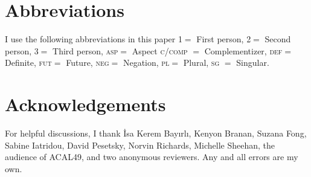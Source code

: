 \documentclass[output=paper,colorlinks,citecolor=brown]{langscibook}
\begin{document}
\section*{Abbreviations}
I use the following abbreviations in this paper
1$=$ First person, 
2$=$ Second  person, 
3$=$ Third  person, 
\textsc{asp}$=$ Aspect
\textsc{c/comp} $=$ Complementizer, 
\textsc{def}$=$ Definite,
\textsc{fut}$=$ Future,
\textsc{neg}$=$ Negation,
\textsc{pl}$=$ Plural,
\textsc{sg} $=$ Singular. 

\section*{Acknowledgements}
For helpful discussions, I thank İsa Kerem Bayırlı, Kenyon Branan, Suzana Fong, Sabine Iatridou, David Pesetsky, Norvin Richards, Michelle Sheehan, the audience of ACAL49, and two anonymous reviewers. Any and all errors are my own.

\printbibliography[heading=subbibliography,notkeyword=this]
\end{document}
